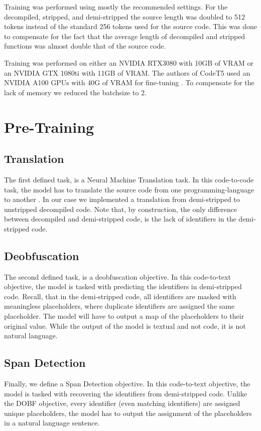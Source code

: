 
Training was performed using mostly the recommended settings. For the decompiled, stripped, and demi-stripped the source length was doubled to 512 tokens instead of the standard 256 tokens used for the source code. This was done to compensate for the fact that the average length of decompiled and stripped functions was almost double that of the source code.

Training was performed on either an NVIDIA RTX3080 with 10GB of VRAM or an NVIDIA GTX 1080ti with 11GB of VRAM. The authors of CodeT5 used an NVIDIA A100 GPUs with 40G of VRAM for fine-tuning \cite{CodeT5}. To compensate for the lack of memory we reduced the batchsize to 2.

\section{Pre-Training}

\subsection{Translation}
The first defined task, is a Neural Machine Translation task. In this code-to-code task, the model has to translate the source code from one programming-language to another \cite{CodeXGlue}. In our case we implemented a translation from demi-stripped to unstripped decompiled code. Note that, by construction, the only difference between decompiled and demi-stripped code, is the lack of identifiers in the demi-stripped code.


\subsection{Deobfuscation}
The second defined task, is a deobfuscation objective. In this code-to-text objective, the model is tasked with predicting the identifiers in demi-stripped code. Recall, that in the demi-stripped code, all identifiers are masked with meaningless placeholders, where duplicate identifiers are assigned the same placeholder. The model will have to output a map of the placeholders to their original value. While the output of the model is textual and not code, it is not natural language.


\subsection{Span Detection}
Finally, we define a Span Detection objective. In this code-to-text objective, the model is tasked with recovering the identifiers from demi-stripped code. Unlike the DOBF objective, every identifier (even matching identifiers) are assigned unique placeholders, the model has to output the assignment of the placeholders in a natural language sentence.

